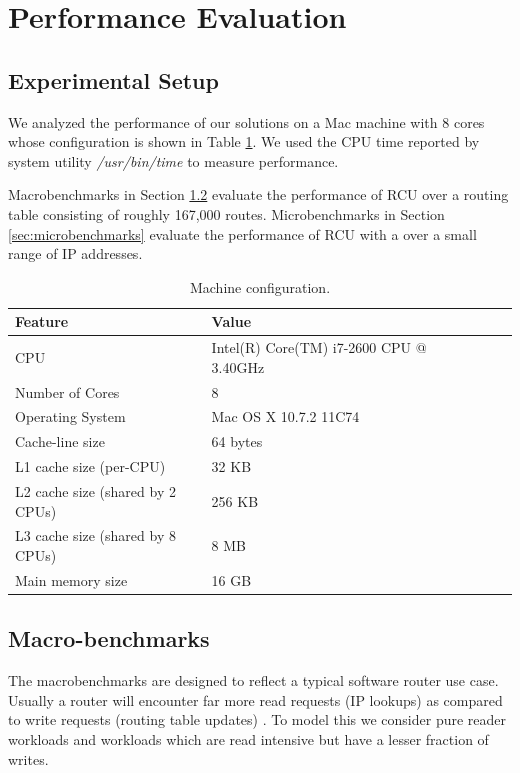 \documentclass[12pt,a4paper]{article}
\begin{document}
\section{Performance Evaluation}
\label{sec:perfeval}
\subsection{Experimental Setup}
We analyzed the performance of our solutions on a Mac machine with 8 cores whose configuration is shown in Table \ref{tbl:machinemac}.
We used the CPU time reported by system utility \emph{/usr/bin/time} to measure performance.

Macrobenchmarks in Section \ref{sec:macrobenchmarks} evaluate the performance of RCU over a routing table consisting of roughly 167,000 routes. Microbenchmarks in Section \ref{sec:microbenchmarks} evaluate the performance of RCU with a over a small range of IP addresses.

\begin{table}
\begin{center}
\begin{tabular}{|l|l|l|l|l|l|}
\hline Feature & Value\\
\hline CPU &Intel(R) Core(TM) i7-2600 CPU @ 3.40GHz\\
\hline Number of Cores & 8\\
\hline Operating System & Mac OS X 10.7.2 11C74\\
\hline Cache-line size & 64 bytes\\
\hline L1 cache size (per-CPU) & 32 KB\\
\hline L2 cache size (shared by 2 CPUs) & 256 KB\\
\hline L3 cache size (shared by 8 CPUs)& 8 MB\\
\hline Main memory size & 16 GB\\
\hline
\end{tabular}
\end{center}
\caption{Machine configuration.}
\label{tbl:machinemac}
\end{table}

\subsection{Macro-benchmarks}
\label{sec:macrobenchmarks}

The macrobenchmarks are designed to reflect a typical software router
use case. Usually a router will encounter far more read requests (IP
lookups) as compared to write requests (routing table updates) . To
model this we consider pure reader workloads and workloads which are
read intensive but have a lesser fraction of writes.\\
\end{document}
